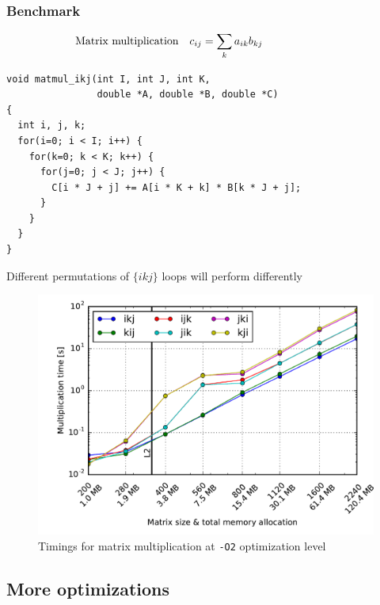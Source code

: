 \documentclass[usenames,dvipsnames,mathserif,compress]{beamer}
\begin{document}
\begin{frame}[fragile]
  \frametitle{Benchmark}
  \begin{align}
    \hspace{-2cm} \textrm{Matrix multiplication}\quad c_{ij} &= \sum_k a_{ik} b_{kj}\nonumber
  \end{align}
\begin{lstlisting}
void matmul_ikj(int I, int J, int K,
                double *A, double *B, double *C)
{
  int i, j, k;
  for(i=0; i < I; i++) {
    for(k=0; k < K; k++) {
      for(j=0; j < J; j++) {
        C[i * J + j] += A[i * K + k] * B[k * J + j];
      }
    }
  }
}
\end{lstlisting}
Different permutations of $\{ikj\}$ loops will perform differently
\end{frame}


\begin{frame}
  \begin{figure}
  \includegraphics[width=.95\textwidth]{code/timings-matmul}
  \caption{Timings for matrix multiplication
  at \texttt{-O2} optimization level}
  \end{figure}
\end{frame}


\subsection*{More optimizations}
\end{document}
